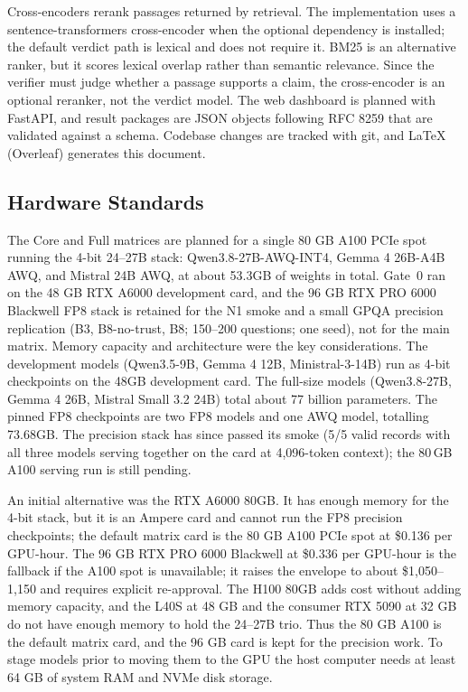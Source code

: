 Cross-encoders rerank passages returned by retrieval. The implementation uses a sentence-transformers cross-encoder when the optional dependency is installed; the default verdict path is lexical and does not require it. BM25 is an alternative ranker, but it scores lexical overlap rather than semantic relevance. Since the verifier must judge whether a passage supports a claim, the cross-encoder is an optional reranker, not the verdict model. The web dashboard is planned with FastAPI, and result packages are JSON objects following RFC 8259 that are validated against a schema. Codebase changes are tracked with git, and LaTeX (Overleaf) generates this document.

\subsection{Hardware Standards}

The Core and Full matrices are planned for a single 80 GB A100 PCIe spot running the 4-bit 24--27B stack: Qwen3.8-27B-AWQ-INT4, Gemma 4 26B-A4B AWQ, and Mistral 24B AWQ, at about 53.3GB of weights in total. Gate~0 ran on the 48 GB RTX A6000 development card, and the 96 GB RTX PRO 6000 Blackwell FP8 stack is retained for the N1 smoke and a small GPQA precision replication (B3, B8-no-trust, B8; 150--200 questions; one seed), not for the main matrix. Memory capacity and architecture were the key considerations. The development models (Qwen3.5-9B, Gemma 4 12B, Ministral-3-14B) run as 4-bit checkpoints on the 48GB development card. The full-size models (Qwen3.8-27B, Gemma 4 26B, Mistral Small 3.2 24B) total about 77 billion parameters. The pinned FP8 checkpoints are two FP8 models and one AWQ model, totalling 73.68GB. The precision stack has since passed its smoke (5/5 valid records with all three models serving together on the card at 4{,}096-token context); the 80\,GB A100 serving run is still pending.

An initial alternative was the RTX A6000 80GB. It has enough memory for the 4-bit stack, but it is an Ampere card and cannot run the FP8 precision checkpoints; the default matrix card is the 80 GB A100 PCIe spot at \$0.136 per GPU-hour. The 96 GB RTX PRO 6000 Blackwell at \$0.336 per GPU-hour is the fallback if the A100 spot is unavailable; it raises the envelope to about \$1,050--1,150 and requires explicit re-approval. The H100 80GB adds cost without adding memory capacity, and the L40S at 48 GB and the consumer RTX 5090 at 32 GB do not have enough memory to hold the 24--27B trio. Thus the 80 GB A100 is the default matrix card, and the 96 GB card is kept for the precision work. To stage models prior to moving them to the GPU the host computer needs at least 64 GB of system RAM and NVMe disk storage.

